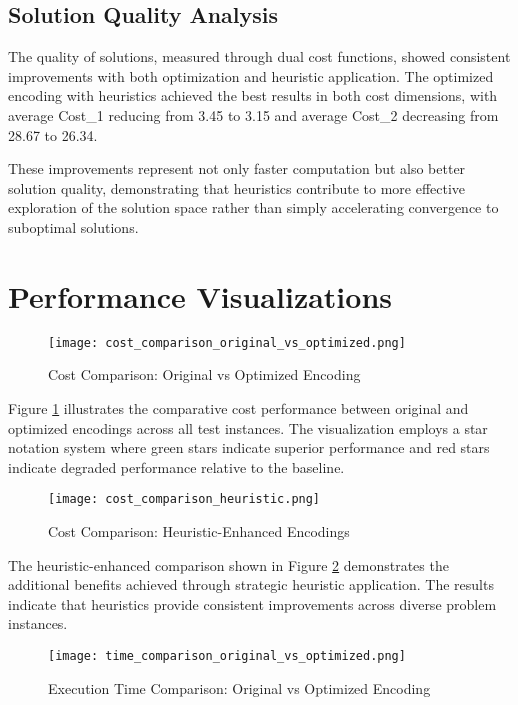 \documentclass[11pt,a4paper]{article}
\begin{document}
\subsection{Solution Quality Analysis}

The quality of solutions, measured through dual cost functions, showed consistent improvements with both optimization and heuristic application. The optimized encoding with heuristics achieved the best results in both cost dimensions, with average Cost\_1 reducing from 3.45 to 3.15 and average Cost\_2 decreasing from 28.67 to 26.34.

These improvements represent not only faster computation but also better solution quality, demonstrating that heuristics contribute to more effective exploration of the solution space rather than simply accelerating convergence to suboptimal solutions.

\section{Performance Visualizations}

\begin{figure}[H]
    \centering
    \texttt{[image: cost\_comparison\_original\_vs\_optimized.png]}
    \caption{Cost Comparison: Original vs Optimized Encoding}
    \label{fig:cost_orig_opt}
\end{figure}

Figure \ref{fig:cost_orig_opt} illustrates the comparative cost performance between original and optimized encodings across all test instances. The visualization employs a star notation system where green stars indicate superior performance and red stars indicate degraded performance relative to the baseline.

\begin{figure}[H]
    \centering
    \texttt{[image: cost\_comparison\_heuristic.png]}
    \caption{Cost Comparison: Heuristic-Enhanced Encodings}
    \label{fig:cost_heuristic}
\end{figure}

The heuristic-enhanced comparison shown in Figure \ref{fig:cost_heuristic} demonstrates the additional benefits achieved through strategic heuristic application. The results indicate that heuristics provide consistent improvements across diverse problem instances.

\begin{figure}[H]
    \centering
    \texttt{[image: time\_comparison\_original\_vs\_optimized.png]}
    \caption{Execution Time Comparison: Original vs Optimized Encoding}
    \label{fig:time_orig_opt}
\end{figure}
\end{document}
